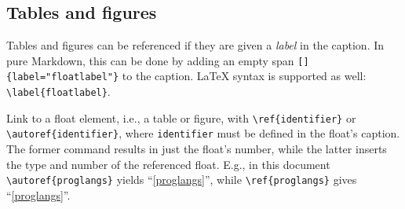 \documentclass[10pt,a4paper,onecolumn]{article}
\begin{document}
\subsection{Tables and figures}\label{tables-and-figures}

Tables and figures can be referenced if they are given a \emph{label} in
the caption. In pure Markdown, this can be done by adding an empty span
\texttt{{[}{]}\{label="floatlabel"\}} to the caption. LaTeX syntax is
supported as well: \texttt{\textbackslash{}label\{floatlabel\}}.

Link to a float element, i.e., a table or figure, with
\texttt{\textbackslash{}ref\{identifier\}} or
\texttt{\textbackslash{}autoref\{identifier\}}, where
\texttt{identifier} must be defined in the float's caption. The former
command results in just the float's number, while the latter inserts the
type and number of the referenced float. E.g., in this document
\texttt{\textbackslash{}autoref\{proglangs\}} yields
``\autoref{proglangs}'', while \texttt{\textbackslash{}ref\{proglangs\}}
gives ``\ref{proglangs}''.
\end{document}
